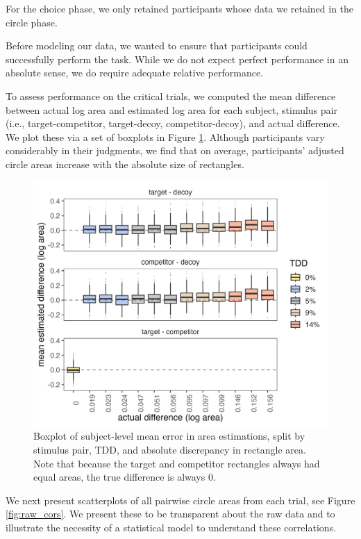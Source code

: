 \documentclass{umassthesis}          %
\begin{document}
For the choice phase, we only retained participants whose data we retained in the circle phase.

Before modeling our data, we wanted to ensure that participants could successfully perform the task. While we do not expect perfect performance in an absolute sense, we do require adequate relative performance. 

To assess performance on the critical trials, we computed the mean difference between actual log area and estimated log area for each subject, stimulus pair (i.e., target-competitor, target-decoy, competitor-decoy), and actual difference. We plot these via a set of boxplots in Figure \ref{fig:circle_boxplots}. Although participants vary considerably in their judgments, we find that on average, participants' adjusted circle areas increase with the absolute size of rectangles. 


\begin{figure}
   \includegraphics[width=\textwidth]{figures/circleAreaPhase_boxplot_meanlogdiffs_no_outliers.jpeg}
   \caption{Boxplot of subject-level mean error in area estimations, split by stimulus pair, TDD, and absolute discrepancy in rectangle area. Note that because the target and competitor rectangles always had equal areas, the true difference is always 0.}
   \label{fig:circle_boxplots}
\end{figure}

We next present scatterplots of all pairwise circle areas from each trial, see Figure \ref{fig:raw_cors}. We present these to be transparent about the raw data and to illustrate the necessity of a statistical model to understand these correlations. 
\end{document}
